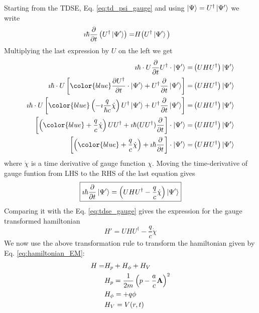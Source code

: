 \documentclass[11pt]{article}
\begin{document}
Starting from the TDSE, Eq. \ref{eq:td_psi_gauge} and using  $\ket{\Psi}=U^\dag\ket{\Psi'}$  we write 
\begin{align*}
  \imath \hbar{\pdv{}{t}} \left(U^\dag \ket{\Psi'}\right) = & H \big(U^\dag \ket{\Psi'}\big) 
\end{align*}
Multiplying the last expression by $U$ on the left we get 
\begin{align*}
\imath \hbar \cdot U {\pdv{}{t}} U^\dag \cdot  \ket{\Psi'} = & \left( UH U^\dag\right) \ket{\Psi'} \\
\imath \hbar \cdot U \left[  {\color{blue} \pdv{U^\dag}{t} } \cdot\ket{\Psi'}   + U^\dag \pdv{}{t}
    \ket{\Psi'}\right] =& \left( UH U^\dag\right) \ket{\Psi'} \\
\imath \hbar \cdot U \left[ {\color{blue} \left(- \imath \frac{q}{\hbar c} \dot \chi \right) U^\dag }\ket{\Psi'} 
    + U^\dag \pdv{}{t}  \ket{\Psi'}\right] =& \left( UH U^\dag\right) \ket{\Psi'} \\
\left[   \left({\color{blue} +\frac{q}{ c} \dot \chi} \right) U U^\dag + \imath \hbar (UU^\dag )   \pdv{}{t}\right] \cdot \ket{\Psi'} =   & \left( UH U^\dag\right) \ket{\Psi'} \\
\left[   \left({\color{blue} +\frac{q}{ c} \dot \chi} \right) + \imath \hbar \pdv{}{t}\right] \cdot  \ket{\Psi'} =   & \left( UH U^\dag\right) \ket{\Psi'} 
\end{align*}
where $\dot \chi$ is a time derivative of gauge function $\chi$. Moving the  time-derivative of gauge funtion from LHS to the RHS of the last equation gives
\begin{equation} 
\boxed{
    \imath \hbar \pdv{}{t} \ket{\Psi'}  =  \left( U H  U^\dag  - \frac{q}{c} \dot \chi \right) \ket{\Psi'} }
\end{equation}
Comparing it  with  the Eq. \ref{eq:tdse_gauge}   gives the expression for the gauge transformed hamiltonian
\begin{equation}
\boxed{    H' =  UHU^\dag -\frac{q}{c} \dot\chi }
\end{equation} 
We now  use the above transformation rule  to  transform the hamiltonian given by Eq. \ref{eq:hamiltonian_EM}:
\begin{align*}
    H =&  H_p + H_\phi + H_V \\
    &H_p =  \frac{1}{2m} \left(p -\frac{a}{c} \vb A\right)^2 \\ 
    &H_\phi =   +q\phi  \\
    &H_V =   V(r,t) 
\end{align*}
\end{document}
